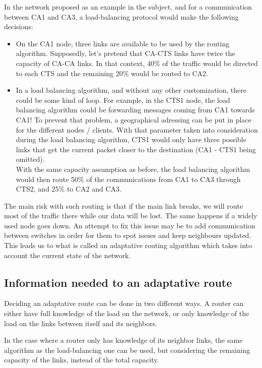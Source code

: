 \documentclass[lettersize,journal]{IEEEtran} %
\begin{document}
In the network proposed as an example in the subject, and for a communication between CA1 and CA3,
a load-balancing protocol would make the following decisions:
\begin{itemize}
        \item On the CA1 node, three links are available to be used by the routing algorithm.
        Supposedly, let's pretend that CA-CTS links have twice the capacity of CA-CA links.
        In that context, 40\% of the traffic would be directed to each CTS and the remaining 20\% 
        would be routed to CA2.
        \item In a load balancing algorithm, and without any other customization, there could be 
        some kind of loop. For example, in the CTS1 node, the load balancing algorithm could be
        forwarding messages coming from CA1 towards CA1! To prevent that problem, a geographical
        adressing can be put in place for the different nodes / clients. With that parameter taken
        into consideration during the load balancing algorithm, CTS1 would only have three possible
        links that get the current packet closer to the destination (CA1 - CTS1 being omitted).\\
        With the same capacity assumption as before, the load balancing algorithm would then route
        50\% of the communications from CA1 to CA3 through CTS2, and 25\% to CA2 and CA3.       
\end{itemize} 

The main risk with such routing is that if the main link breaks, we will route most of the
traffic there while our data will be lost. The same happens if a widely used node goes down.
An attempt to fix this issue may be to add communication between switches in order for them
to spot issues and keep neighbours updated. This leads us to what is called an adaptative routing algorithm
which takes into account the current state of the network.

\subsection{Information needed to an adaptative route}
Deciding an adaptative route can be done in two different ways.
A router can either have full knowledge of the load on the network, 
or only knowledge of the load on the links between itself and its neighbors.

In the case where a router only has knowledge of its neighbor links, 
the same algorithm as the load-balancing one can be used, but considering 
the remaining capacity of the links, instead of the total capacity.
\end{document}
